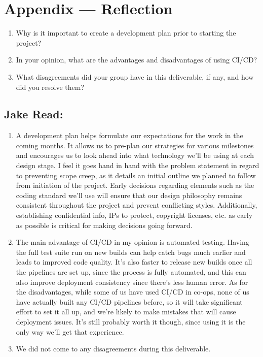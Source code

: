 \documentclass{article}
\begin{document}
\section*{Appendix --- Reflection}

%

\begin{enumerate}
    \item Why is it important to create a development plan prior to starting the
    project?
    \item In your opinion, what are the advantages and disadvantages of using
    CI/CD?
    \item What disagreements did your group have in this deliverable, if any,
    and how did you resolve them?
\end{enumerate}

\subsection*{Jake Read:}\label{subsec:jake-read-reflection}
\begin{enumerate}
    \item
        A development plan helps formulate our expectations for the work in the coming months.
        It allows us to pre-plan our strategies for various milestones and encourages us to look ahead into what technology we’ll be using at each design stage.
        I feel it goes hand in hand with the problem statement in regard to preventing scope creep, as it details an initial outline we planned to follow from initiation of the project.
        Early decisions regarding elements such as the coding standard we’ll use will ensure that our design philosophy remains consistent throughout the project and prevent conflicting styles.
        Additionally, establishing confidential info, IPs to protect, copyright licenses, etc. as early as possible is critical for making decisions going forward.

    \item
        The main advantage of CI/CD in my opinion is automated testing.
        Having the full test suite run on new builds can help catch bugs much earlier and leads to improved code quality.
        It’s also faster to release new builds once all the pipelines are set up, since the process is fully automated, and this can also improve deployment consistency since there’s less human error.
        As for the disadvantages, while some of us have used CI/CD in co-ops, none of us have actually built any CI/CD pipelines before, so it will take significant effort to set it all up, and we’re likely to make mistakes that will cause deployment issues.
        It’s still probably worth it though, since using it is the only way we’ll get that experience.

    \item
        We did not come to any disagreements during this deliverable.
\end{enumerate}
\end{document}
